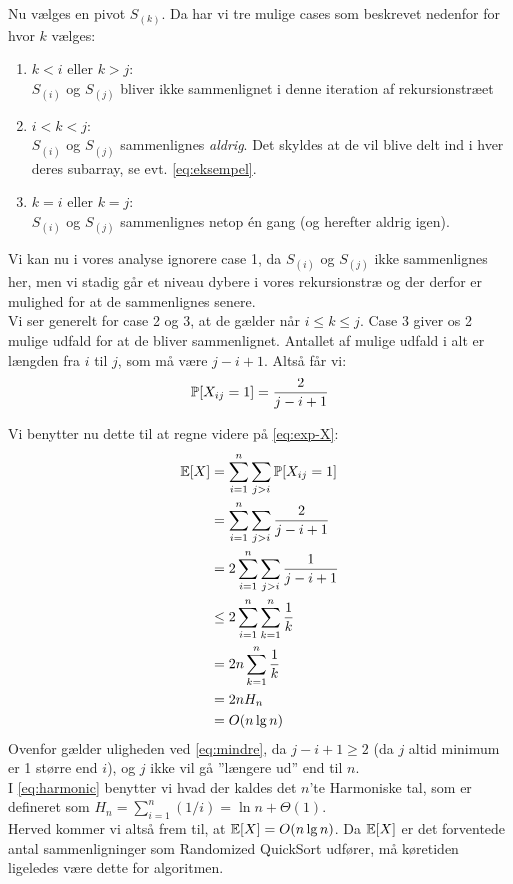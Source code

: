 Nu vælges en pivot $S_{(k)}$. Da har vi tre mulige cases som beskrevet nedenfor for hvor $k$ vælges:

\begin{enumerate}
	\item $k < i$ eller $k > j$:\\
	$S_{(i)}$ og $S_{(j)}$ bliver ikke sammenlignet i denne iteration af rekursionstræet
	\item $i < k < j$:\\
	$S_{(i)}$ og $S_{(j)}$ sammenlignes \textit{aldrig}. Det skyldes at de vil blive delt ind i hver deres subarray, se evt. \cref{eq:eksempel}.
	\item $k=i$ eller $k=j$:\\
	$S_{(i)}$ og $S_{(j)}$ sammenlignes netop én gang (og herefter aldrig igen).
\end{enumerate}

Vi kan nu i vores analyse ignorere case 1, da $S_{(i)}$ og $S_{(j)}$ ikke sammenlignes her, men vi stadig går et niveau dybere i vores rekursionstræ og der derfor er mulighed for at de sammenlignes senere.\\

Vi ser generelt for case 2 og 3, at de gælder når $i \leq k \leq j$. Case 3 giver os 2 mulige udfald for at de bliver sammenlignet. Antallet af mulige udfald i alt er længden fra $i$ til $j$, som må være $j - i + 1$. Altså får vi:
\begin{align} \label{eq:prob-xij}
\P[X_{ij} = 1] = \frac{2}{j - i + 1}
\end{align}


Vi benytter nu dette til at regne videre på \cref{eq:exp-X}:
\begin{align}
\e[X] &= \sum_{i=1}^n \sum_{j>i} \P[X_{ij} = 1] \nonumber \\
      &= \sum_{i=1}^n \sum_{j>i} \frac{2}{j - i + 1} \nonumber \\
      &= 2 \sum_{i=1}^n \sum_{j>i} \frac{1}{j - i + 1} \nonumber \\
   &\leq 2 \sum_{i=1}^n \sum_{k=1}^n \frac{1}{k} \label{eq:mindre} \\
      &= 2n \sum_{k=1}^n \frac{1}{k} \nonumber \\
      &= 2n H_n \label{eq:harmonic} \\
      &= O(n \lg n) \nonumber
\end{align}
Ovenfor gælder uligheden ved \cref{eq:mindre}, da $j-i+1 \geq 2$ (da $j$ altid minimum er 1 større end $i$), og $j$ ikke vil gå ''længere ud'' end til $n$.\\
I \cref{eq:harmonic} benytter vi hvad der kaldes det $n$'te Harmoniske tal, som er defineret som $H_n = \sum_{i=1}^n (1/i) = \ln n + \Theta(1)$.\\

Herved kommer vi altså frem til, at $\e[X] = O(n \lg n)$. Da $\e[X]$ er det forventede antal sammenligninger som Randomized QuickSort udfører, må køretiden ligeledes være dette for algoritmen.
